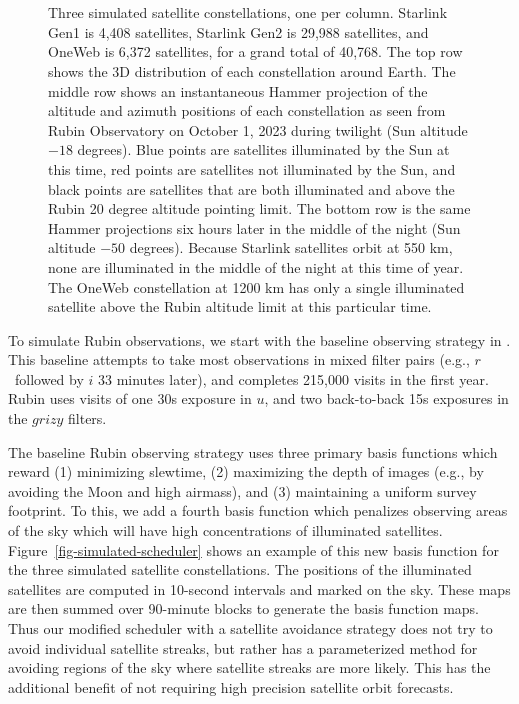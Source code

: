 \documentclass[twocolumn]{aastex631}
\begin{document}
\begin{figure*}[ht!]
\\
\\
\caption{Three simulated satellite constellations, one per column. Starlink Gen1 is 4,408 satellites, Starlink Gen2 is 29,988 satellites, and OneWeb is 6,372 satellites, for a grand total of 40,768. The top row shows the 3D distribution of each constellation around Earth. The middle row shows an instantaneous Hammer projection of the altitude and azimuth positions of each constellation as seen from Rubin Observatory on October 1, 2023 during twilight (Sun altitude $-18$ degrees). Blue points are satellites illuminated by the Sun at this time, red points are satellites not illuminated by the Sun, and black points are satellites that are both illuminated and above the Rubin 20 degree altitude pointing limit. The bottom row is the same Hammer projections six hours later in the middle of the night (Sun altitude $-50$ degrees). Because Starlink satellites orbit at 550 km, none are illuminated in the middle of the night at this time of year. The OneWeb constellation at 1200 km has only a single illuminated satellite above the Rubin altitude limit at this particular time.
\vspace{4em}
\label{fig-simulated-constellations}
}
\end{figure*}

To simulate Rubin observations, we start with the baseline observing strategy in \citet{yoachim2022b}. This baseline attempts to take most observations in mixed filter pairs (e.g., $r$\ followed by $i$ 33 minutes later), and completes 215,000 visits in the first year. Rubin uses visits of one 30s exposure in $u$, and two back-to-back 15s exposures in the $grizy$ filters. 

The baseline Rubin observing strategy uses three primary basis functions which reward (1) minimizing slewtime, (2) maximizing the depth of images (e.g., by avoiding the Moon and high airmass), and (3) maintaining a uniform survey footprint. To this, we add a fourth basis function which penalizes observing areas of the sky which will have high concentrations of illuminated satellites. Figure~\ref{fig-simulated-scheduler} shows an example of this new basis function for the three simulated satellite constellations. The positions of the illuminated satellites are computed in 10-second intervals and marked on the sky. These maps are then summed over 90-minute blocks to generate the basis function maps. Thus our modified scheduler with a satellite avoidance strategy does not try to avoid individual satellite streaks, but rather has a parameterized method for avoiding regions of the sky where satellite streaks are more likely. This has the additional benefit of not requiring high precision satellite orbit forecasts.
\end{document}
